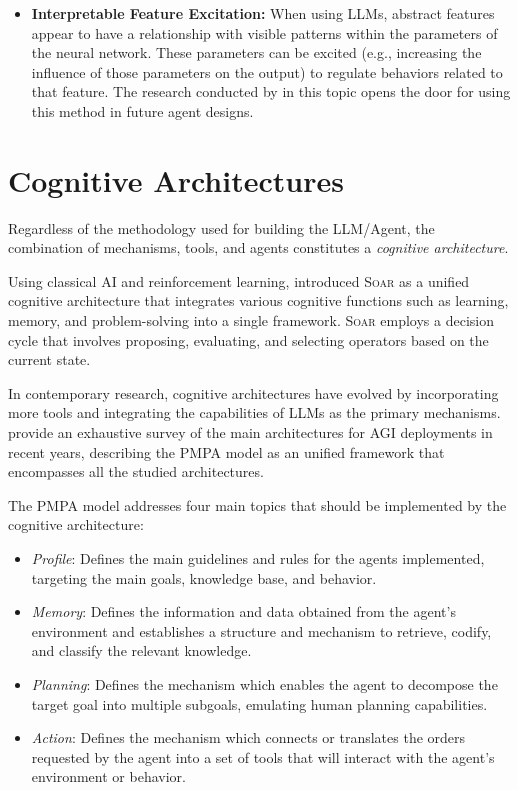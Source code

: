 \begin{itemize}
    \item \textbf{Interpretable Feature Excitation:} When using LLMs, abstract
    features appear to have a relationship with visible patterns within the
    parameters of the neural network. These parameters can be excited (e.g.,
    increasing the influence of those parameters on the output) to regulate
    behaviors related to that feature. The research conducted by
    \cite{viteri2024scaling} in this topic opens the door for using this method
    in future agent designs.

\end{itemize}

\section{Cognitive Architectures}
Regardless of the methodology used for building the LLM/Agent, the combination
of mechanisms, tools, and agents constitutes a \emph{cognitive architecture}.

Using classical AI and reinforcement learning, \citet{laird2019soar} introduced
\textsc{Soar} as a unified cognitive architecture that integrates various cognitive
functions such as learning, memory, and problem-solving into a single framework.
\textsc{Soar} employs a decision cycle that involves proposing, evaluating, and selecting
operators based on the current state.

In contemporary research, cognitive architectures have evolved by incorporating
more tools and integrating the capabilities of LLMs as the primary mechanisms.
\citet{wang2024survey} provide an exhaustive survey of the main architectures for
AGI deployments in recent years, describing the \textsc{PMPA} model as an unified
framework that encompasses all the studied architectures.

The PMPA model addresses four main topics that should be implemented by the cognitive architecture:
\begin{itemize}
    \item \textit{Profile}: Defines the main guidelines and rules for the agents
    implemented, targeting the main goals, knowledge base, and behavior.
    \item \textit{Memory}: Defines the information and data obtained from the
    agent's environment and establishes a structure and mechanism to retrieve,
    codify, and classify the relevant knowledge.
    \item \textit{Planning}: Defines the mechanism which enables the agent to
    decompose the target goal into multiple subgoals, emulating human planning
    capabilities.
    \item \textit{Action}: Defines the mechanism which connects or translates
    the orders requested by the agent into a set of tools that will interact
    with the agent's environment or behavior.
\end{itemize}

